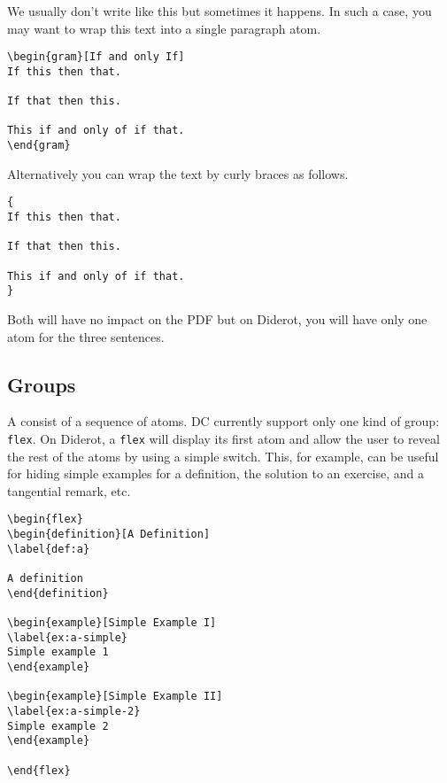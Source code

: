 We usually don't write like this but sometimes it happens.
%
In such a case, you may want to wrap this text into a single paragraph atom.
%
\begin{lstlisting}
\begin{gram}[If and only If]
If this then that.

If that then this.

This if and only of if that.
\end{gram}
\end{lstlisting}
%
Alternatively you can wrap the text by curly braces as follows.
%
\begin{lstlisting}
{
If this then that.

If that then this.

This if and only of if that.
}
\end{lstlisting}
%
%
Both will have no impact on the PDF but on Diderot, you will have only one atom for the three sentences.


\subsection{Groups}
\label{sec:mtl::groups}

\begin{definition}[Group]
A  consist of a sequence of atoms.  DC currently support only one kind of group: \lstinline`flex`.  On Diderot, a \lstinline`flex` will display its first atom and allow the user to reveal the rest of the atoms by using a simple switch.  This, for example, can be useful for hiding simple examples for a definition, the solution to an exercise, and a tangential remark, etc. 

\begin{lstlisting}
\begin{flex}
\begin{definition}[A Definition]
\label{def:a}

A definition
\end{definition}

\begin{example}[Simple Example I]
\label{ex:a-simple}
Simple example 1
\end{example}

\begin{example}[Simple Example II]
\label{ex:a-simple-2}
Simple example 2
\end{example}

\end{flex}
\end{lstlisting}
\end{definition}

